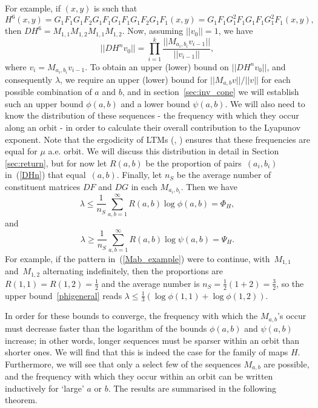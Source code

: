 \documentclass{iopart}
\begin{document}
For example, if $(x,y)$ is such that
\begin{equation}\label{Mab_example}
H^6(x,y)
= G_1 F_1 G_1 F_2 G_1 F_1 G_1 F_1 G_1 F_2 G_1 F_1 (x,y)
= G_1 F_1 G_1^2 F_1 G_1 F_1 G_1^2 F_1(x,y),
\end{equation}
then $DH^6 = M_{1,1} M_{1,2} M_{1,1} M_{1,2}$. Now, assuming $||v_0|| = 1$, we have
\begin{equation}
\label{Hnvequalsmab}
||DH^n v_0 || = \prod_{i=1}^k \frac{||M_{a_i , b_i} v_{i-1}||}{||v_{i-1}||},
\end{equation}
where $v_i = M_{a_i, b_i} v_{i-1}$. To obtain an upper (lower) bound on $||DH^n v_0 ||$, and consequently $\lambda$, we require an upper (lower) bound for $||M_{a , b} v||/||v||$ for each possible combination of $a$ and $b$, and in section~\ref{sec:inv_cone} we will establish such an upper bound $\phi(a,b)$ and a lower bound $\psi(a,b)$. We will also need to know the distribution of these sequences - the frequency with which they occur along an orbit - in order to calculate their overall contribution to the Lyapunov exponent. Note that the ergodicity of LTMs (\cite{burton1980ergodicity}, \cite{przytycki1983ergodicity}) ensures that these frequencies are equal for $\mu$ a.e. orbit. We will discuss this distribution in detail in Section \ref{sec:return}, but for now let $R(a,b)$ be the proportion of pairs~$(a_i,b_i)$ in~(\ref{DHn}) that equal~$(a,b)$. Finally, let $n_S$ be the average number of constituent matrices $DF$ and $DG$ in each $M_{a_i, b_i}$.  Then we have
\begin{equation}
\label{phigeneral}
\lambda \le \frac{1}{n_S} \sum_{a,b = 1}^\infty R(a,b) \log \phi (a,b) =  \Phi_H,
\end{equation}
and
\begin{equation}
\label{psigeneral}
\lambda \ge \frac{1}{n_S} \sum_{a,b = 1}^\infty R(a,b) \log \psi (a,b) =  \Psi_H.
\end{equation}
For example, if the pattern in~(\ref{Mab_example}) were to continue, with~$M_{1,1}$ and~$M_{1,2}$ alternating indefinitely, then the proportions are $R(1,1) = R(1,2) = \frac12$ and the average number is $n_S = \frac12 (1+2) = \frac32$, so the upper bound~\eqref{phigeneral} reads $\lambda \le \frac13 (\log\phi(1,1) + \log\phi(1,2))$.

In order for these bounds to converge, the frequency with which the $M_{a,b}$'s occur must decrease faster than the logarithm of the bounds $\phi (a,b)$ and $\psi (a,b)$ increase; in other words, longer sequences must be sparser within an orbit than shorter ones. We will find that this is indeed the case for the family of maps $H$. Furthermore, we will see that only a select few of the sequences $M_{a,b}$ are possible, and the frequency with which they occur within an orbit can be written inductively for `large' $a$ or $b$. The results are summarised in the following theorem.
\end{document}
